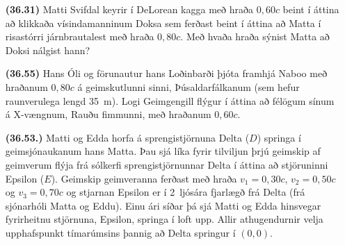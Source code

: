 \ifdefined \wholebook \else\documentclass[oneside]{book}\usepackage{EdlBook}\graphicspath{{figures/}}
\begin{document}
\begin{enumerate}[label = \textbf{(\alph*)}]

\item[\textbf{(36.31)}] Matti Svifdal keyrir í DeLorean kagga með hraða $0,60c$ beint í áttina að klikkaða vísindamanninum Doksa sem ferðast beint í áttina að Matta í risastórri járnbrautalest með hraða $0,80c$. Með hvaða hraða sýnist Matta að Doksi nálgist hann?

\item[\textbf{(36.55)}] Hans Óli og förunautur hans Loðinbarði þjóta framhjá Naboo með hraðanum $0,80c$ á geimskutlunni sinni, Þúsaldarfálkanum (sem hefur raunverulega lengd \SI{35}{m}). Logi Geimgengill flýgur í áttina að félögum sínum á X-vængnum, Rauðu fimmunni, með hraðanum $0,60c$.

\item[\textbf{(36.53.)}] Matti og Edda horfa á sprengistjörnuna Delta ($D$) springa í geimsjónaukanum hans Matta. Þau sjá líka fyrir tilviljun þrjú geimskip af geimverum flýja frá sólkerfi sprengistjörnunnar Delta í áttina að stjöruninni Epsilon ($E$). Geimskip geimveranna ferðast með hraða $v_1 = 0,30c$, $v_2 = 0,50c$ og $v_3 = 0,70c$ og stjarnan Epsilon er í \SI{2}{ljósára} fjarlægð frá Delta (frá sjónarhóli Matta og Eddu). Einu ári síðar þá sjá Matti og Edda hinsvegar fyrirheitnu stjörnuna, Epsilon, springa í loft upp. Allir athugendurnir velja upphafspunkt tímarúmsins þannig að Delta springur í $(0,0)$.


\end{enumerate}
\end{document}
